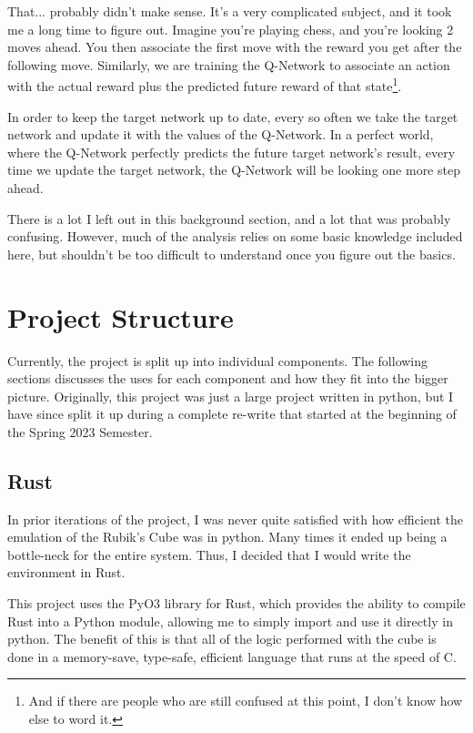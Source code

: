 \documentclass[12pt]{article}
\begin{document}
That... probably didn't make sense. It's a very complicated subject, and it took me a long time to figure out. Imagine you're playing chess, and you're looking 2 moves ahead. You then associate the first move with the reward you get after the following move. Similarly, we are training the Q-Network to associate an action with the actual reward plus the predicted future reward of that state\footnote{And if there are people who are still confused at this point, I don't know how else to word it.}.

In order to keep the target network up to date, every so often we take the target network and update it with the values of the Q-Network. In a perfect world, where the Q-Network perfectly predicts the future target network's result, every time we update the target network, the Q-Network will be looking one more step ahead.

There is a lot I left out in this background section, and a lot that was probably confusing. However, much of the analysis relies on some basic knowledge included here, but shouldn't be too difficult to understand once you figure out the basics.


\newpage

\section{Project Structure}

Currently, the project is split up into individual components. The following sections discusses the uses for each component and how they fit into the bigger picture. Originally, this project was just a large project written in python, but I have since split it up during a complete re-write that started at the beginning of the Spring 2023 Semester.

\subsection{Rust}

In prior iterations of the project, I was never quite satisfied with how efficient the emulation of the Rubik's Cube was in python. Many times it ended up being a bottle-neck for the entire system. Thus, I decided that I would write the environment in Rust.

This project uses the PyO3 library for Rust, which provides the ability to compile Rust into a Python module, allowing me to simply import and use it directly in python. The benefit of this is that all of the logic performed with the cube is done in a memory-save, type-safe, efficient language that runs at the speed of C.
\end{document}
